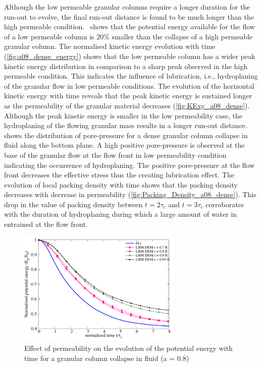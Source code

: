 Although the low permeable granular columns require a longer duration for the 
run-out to evolve, the final run-out distance is found to be much longer than 
the high permeable condition.~ shows that the potential 
energy available for the flow of a low permeable column is 20\% smaller than 
the collapse of a high permeable granular column. The normalised kinetic energy 
evolution with time (\cref{fig:a08_dense_energy}) shows that the low permeable 
column has a wider peak kinetic energy distribution in comparison to a sharp 
peak observed in the high permeable condition. This indicates the influence of 
lubrication, i.e., hydroplaning of the granular flow in low permeable 
conditions. The evolution of the horizontal kinetic energy with time reveals 
that the peak kinetic energy is sustained longer as the permeability of the 
granular material decreases (\cref{fig:KExy_a08_dense}). Although the peak 
kinetic energy is smaller 
in the low permeability case, the hydroplaning of the flowing granular mass 
results in a longer run-out distance.~ shows the 
distribution of pore-pressure for a dense granular column collapse in fluid 
along the bottom plane. A high positive pore-pressure is observed 
at the base of the granular flow at the flow front in low permeability 
condition indicating the occurrence of hydroplaning. The positive pore-pressure 
at the flow front decreases the effective stress thus the creating lubrication 
effect. The evolution of local packing density with time shows that the packing 
density decreases with decrease in permeability 
(\cref{fig:Packing_Density_a08_dense}). This drop 
in the value of packing density between $t = 2\tau_c$ and $t=3\tau_c$ 
corroborates with the duration of hydroplaning during which a large amount of 
water in entrained at the flow front.

\begin{figure}
	\centering
    \includegraphics[width=0.7\textwidth]{PE_a08_dense}
    \caption{Effect of permeability on the evolution of the potential energy 
    with time for a granular column collapse in fluid (a = 0.8)}
    \label{fig:PE_a08_dense}
\end{figure}

